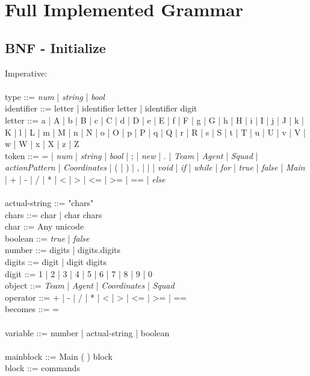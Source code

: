 \section{Full Implemented Grammar}
\label{ap:fullgrammar}

\subsection{BNF - Initialize}

Imperative:\\
\\
type ::= \textit{num} | \textit{string} | \textit{bool}\\
identifier ::= letter | identifier letter | identifier digit\\
letter ::= a | A | b | B | c | C | d | D | e | E | f | F | g | G | h | H | i | I | j | J | k | K | l | L | m | M | n | N | o | O | p | P | q | Q | r | R | s | S | t | T | u | U | v | V | w | W | x | X | z | Z\\
token ::= = | \textit{num} | \textit{string} | \textit{bool} | ; | \textit{new} | . | \textit{Team} | \textit{Agent} | \textit{Squad} | \textit{actionPattern} | \textit{Coordinates}  | ( | ) | , | { | } | \textit{void} | \textit{if} | \textit{while} | \textit{for} | \textit{true} | \textit{false} | \textit{Main} | + | - | / | * | < | > | <= | >= | == | \textit{else}\\
\\
actual-string ::= "chars"\\
chars ::= char | char chars\\
char ::= Any unicode\\
boolean ::= \textit{true} | \textit{false}\\
number ::= digits | digits.digits\\
digits ::= digit | digit digits\\
digit ::= 1 | 2 | 3 | 4 | 5 | 6 | 7 | 8 | 9 | 0\\
object ::= \textit{Team} | \textit{Agent} | \textit{Coordinates} | \textit{Squad}\\
operator ::= + | - | / | * | < | > | <= | >= | ==\\
becomes ::= =\\
\\
variable ::= number | actual-string | boolean\\
\\
mainblock ::= Main ( ) block\\
block ::= { commands }\\
